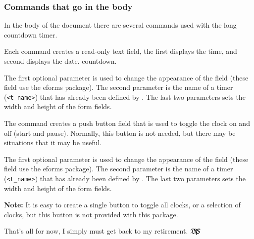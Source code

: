 \documentclass{article}
\def\dps{$\hbox{$\mathfrak D$\kern-.3em\hbox{$\mathfrak P$}%
   \kern-.6em \hbox{$\mathcal S$}}$}
\begin{document}
\subsubsection{Commands that go in the body}

In the body of the document there are several commands used with the long
countdown timer.

\begin{dCmd*}{\linewidth}
\end{dCmd*}

\CmdDescription Each command creates a read-only text field, the first
displays the time, and second displays the date.
countdown.

\PD The first optional parameter is used to change the appearance of the
field (these field use the \textsf{eforms} package). The second
parameter is the name of a timer (\texttt{<t\_name>}) that has already been
defined by . The last two parameters sets the width and
height of the form fields.

\begin{dCmd*}{\linewidth}
\end{dCmd*}

\CmdDescription The command creates a push button field that is used to
toggle the clock on and off (start and pause). Normally, this button is
not needed, but there may be situations that it may be useful.

\PD The first optional parameter is used to change the appearance of the
field (these field use the \textsf{eforms} package). The second
parameter is the name of a timer (\texttt{<t\_name>}) that has already been
defined by . The last two parameters sets the width and
height of the form fields.

\newtopic\textbf{Note:} It is easy to create a single button to toggle all
clocks, or a selection of clocks, but this button is not provided with
this package.

\bigskip

That's all for now, I simply must get back to my retirement. {\dps}
\end{document}
